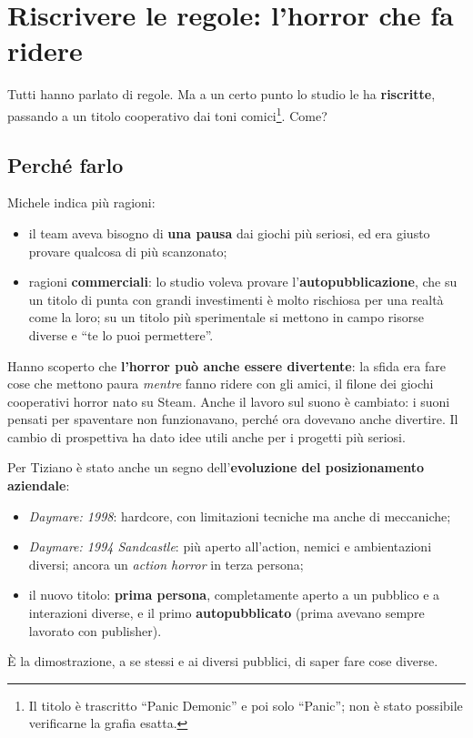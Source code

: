 \section{Riscrivere le regole: l'horror che fa ridere}
\label{sec:c1-3-panic}

Tutti hanno parlato di regole. Ma a un certo punto lo studio le ha
\textbf{riscritte}, passando a un titolo cooperativo dai toni comici\footnote{Il
titolo è trascritto ``Panic Demonic'' e poi solo ``Panic''; non è stato possibile
verificarne la grafia esatta.}. Come?

\subsection{Perché farlo}

Michele indica più ragioni:
\begin{itemize}
  \item il team aveva bisogno di \textbf{una pausa} dai giochi più seriosi, ed
        era giusto provare qualcosa di più scanzonato;
  \item ragioni \textbf{commerciali}: lo studio voleva provare
        l'\textbf{autopubblicazione}, che su un titolo di punta con grandi
        investimenti è molto rischiosa per una realtà come la loro; su un titolo
        più sperimentale si mettono in campo risorse diverse e ``te lo puoi
        permettere''.
\end{itemize}
Hanno scoperto che \textbf{l'horror può anche essere divertente}: la sfida era
fare cose che mettono paura \emph{mentre} fanno ridere con gli amici, il filone
dei giochi cooperativi horror nato su Steam. Anche il lavoro sul suono è
cambiato: i suoni pensati per spaventare non funzionavano, perché ora dovevano
anche divertire. Il cambio di prospettiva ha dato idee utili anche per i progetti
più seriosi.

Per Tiziano è stato anche un segno dell'\textbf{evoluzione del posizionamento
aziendale}:
\begin{itemize}
  \item \emph{Daymare: 1998}: hardcore, con limitazioni tecniche ma anche di
        meccaniche;
  \item \emph{Daymare: 1994 Sandcastle}: più aperto all'action, nemici e
        ambientazioni diversi; ancora un \emph{action horror} in terza persona;
  \item il nuovo titolo: \textbf{prima persona}, completamente aperto a un
        pubblico e a interazioni diverse, e il primo \textbf{autopubblicato}
        (prima avevano sempre lavorato con publisher).
\end{itemize}
È la dimostrazione, a se stessi e ai diversi pubblici, di saper fare cose
diverse.

